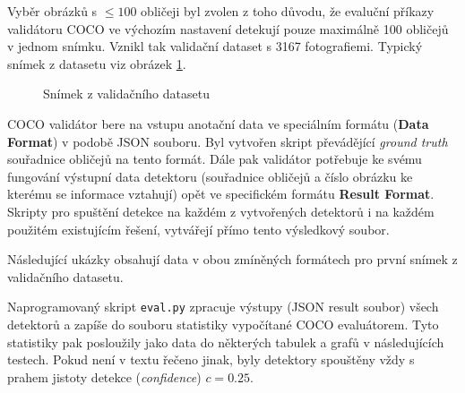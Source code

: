 Vyběr obrázků s  $\le 100$ obličeji byl zvolen z toho důvodu, že evaluční příkazy validátoru COCO ve výchozím nastavení detekují pouze maximálně 100 obličejů v jednom snímku. Vznikl tak validační dataset s 3167 fotografiemi. Typický snímek z datasetu viz obrázek \ref{obrazek:valdataset}.

\begin{figure}[H] 
  \begin{center}
  \label{obrazek:valdataset}
  \caption{Snímek z validačního datasetu}
  \end{center}
\end{figure}

COCO validátor bere na vstupu anotační data ve speciálním formátu (\textbf{Data Format}) v podobě JSON souboru. Byl vytvořen skript převádějící \emph{ground truth} souřadnice obličejů na tento formát. Dále pak validátor potřebuje ke svému fungování výstupní data detektoru (souřadnice obličejů a číslo obrázku ke kterému se informace vztahují) opět ve specifickém formátu \textbf{Result Format}. Skripty pro spuštění detekce na každém z vytvořených detektorů i na každém použitém existujícím řešení, vytvářejí přímo tento výsledkový soubor.

Následující ukázky obsahují data v obou zmíněných formátech pro první snímek z validačního datasetu.


Naprogramovaný skript \texttt{eval.py} zpracuje výstupy (JSON result soubor) všech detektorů a zapíše do souboru statistiky vypočítané COCO evaluátorem. Tyto statistiky pak posloužily jako data do některých tabulek a grafů v následujících testech. Pokud není v textu řečeno jinak, byly detektory spouštěny vždy s prahem jistoty detekce (\emph{confidence}) $c = 0.25$.


